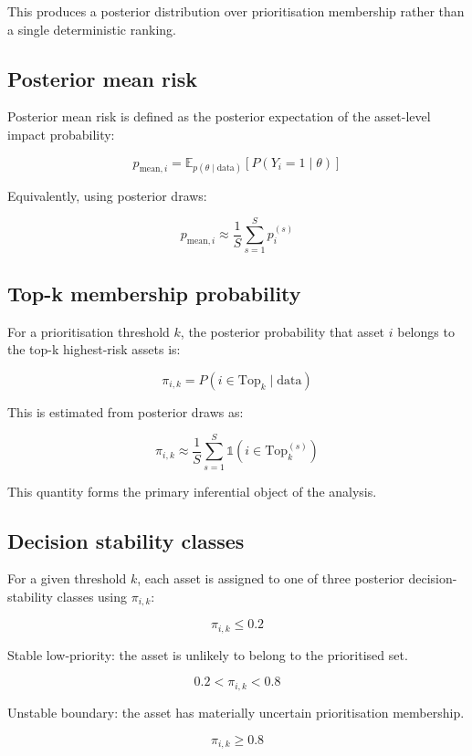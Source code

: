 \documentclass[
]{article}
\begin{document}
This produces a posterior distribution over prioritisation membership
rather than a single deterministic ranking.

\subsection{Posterior mean risk}\label{posterior-mean-risk}

Posterior mean risk is defined as the posterior expectation of the
asset-level impact probability:

\[
p_{\text{mean}, i}
=
\mathbb{E}_{p(\theta \mid \text{data})}
\left[
P(Y_i = 1 \mid \theta)
\right]
\]

Equivalently, using posterior draws:

\[
p_{\text{mean}, i}
\approx
\frac{1}{S}
\sum_{s=1}^{S}
p_i^{(s)}
\]

\subsection{Top-k membership
probability}\label{top-k-membership-probability}

For a prioritisation threshold \(k\), the posterior probability that
asset \(i\) belongs to the top-k highest-risk assets is:

\[
\pi_{i,k}
=
P(i \in \text{Top}_k \mid \text{data})
\]

This is estimated from posterior draws as:

\[
\pi_{i,k}
\approx
\frac{1}{S}
\sum_{s=1}^{S}
\mathbb{1}
\left(
i \in \text{Top}_k^{(s)}
\right)
\]

This quantity forms the primary inferential object of the analysis.

\subsection{Decision stability
classes}\label{decision-stability-classes}

For a given threshold \(k\), each asset is assigned to one of three
posterior decision-stability classes using \(\pi_{i,k}\):

\[
\pi_{i,k} \leq 0.2
\]

Stable low-priority: the asset is unlikely to belong to the prioritised
set.

\[
0.2 < \pi_{i,k} < 0.8
\]

Unstable boundary: the asset has materially uncertain prioritisation
membership.

\[
\pi_{i,k} \geq 0.8
\]
\end{document}
